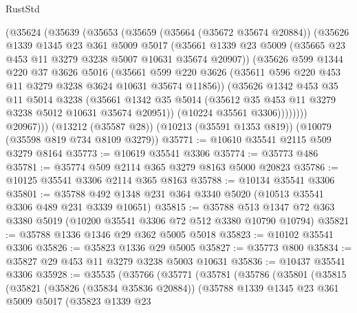 \begin{lexlean}{RustStd}
\begin{coremodule}
{\begin{coremodule}
{{{{{{{{{{{{{{{{{{{{{{{{{{          (@35624
            (@35639
              (@35653
                (@35659
                  (@35664 (@35672 @35674 @20884))
                  (@35626
                    @1339
                    @1345
                    @23
                    @361
                    @5009
                    @5017
                    (@35661
                      @1339
                      @23
                      @5009
                      (@35665 @23 @453 @11 @3279 @3238 @5007 @10631 @35674 @20907))
                    (@35626
                      @599
                      @1344
                      @220
                      @37
                      @3626
                      @5016
                      (@35661
                        @599
                        @220
                        @3626
                        (@35611 @596 @220 @453 @11 @3279 @3238 @3624 @10631 @35674 @11856))
                      (@35626
                        @1342
                        @453
                        @35
                        @11
                        @5014
                        @3238
                        (@35661
                          @1342
                          @35
                          @5014
                          (@35612 @35 @453 @11 @3279 @3238 @5012 @10631 @35674 @20951))
                        (@10224 @35561 @3306))))))))
          @20967)))
    (@13212 (@35587 @28))
    (@10213 (@35591 @1353 @819))
    (@10079 (@35598 @819 @734 @8109 @3279))
@35771 := @10610 @35541 @2115 @509 @3279 @8164
@35773 := @10619 @35541 @3306
@35774 := @35773 @486
@35781 := @35774 @509 @2114 @365 @3279 @8163 @5000 @20823
@35786 := @10125 @35541 @3306 @2114 @365 @8163
@35788 := @10134 @35541 @3306
@35801 := @35788 @492 @1348 @231 @364 @3340 @5020 (@10513 @35541 @3306 @489 @231 @3339 @10651)
@35815 := @35788 @513 @1347 @72 @363 @3380 @5019 (@10200 @35541 @3306 @72 @512 @3380 @10790 @10794)
@35821 := @35788 @1336 @1346 @29 @362 @5005 @5018
@35823 := @10102 @35541 @3306
@35826 := @35823 @1336 @29 @5005
@35827 := @35773 @800
@35834 := @35827 @29 @453 @11 @3279 @3238 @5003 @10631
@35836 := @10437 @35541 @3306
@35928 := @35535
    (@35766
      (@35771
        (@35781
          (@35786
            (@35801
              (@35815
                (@35821
                  (@35826 (@35834 @35836 @20884))
                  (@35788
                    @1339
                    @1345
                    @23
                    @361
                    @5009
                    @5017
                    (@35823
                      @1339
                      @23
}}}}}}}}}}}}}}}}}}}}}}}}}}
\end{coremodule}}
\end{coremodule}
\end{lexlean}
